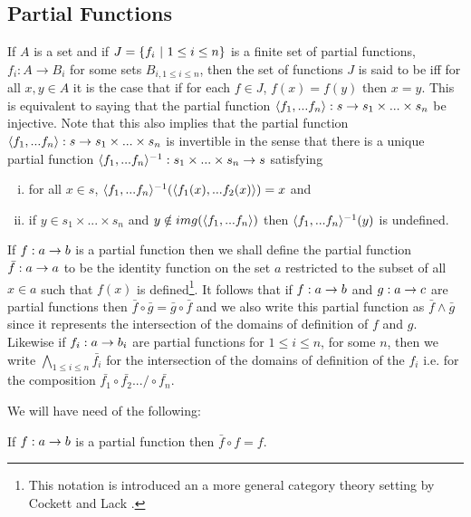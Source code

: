 \subsection{Partial Functions}
If $A$ is a set and if $J= \left\{f_i \ \middle|\  1\leq i \leq n\right\}$ is a finite set of partial functions, $f_i: A \rightarrow B_i$   for some sets $B_{i, 1 \leq i \leq n}$,  then the set of functions 
$J$ is said to be  iff for all $x,y \in A$ it is the case that  if  for each 
$f \in J$, $f(x)=f(y)$ then $x=y$. 
This  is equivalent to saying that  the partial function $\langle f_1,...f_n\rangle: s \rightarrow s_1 \times ... \times s_n $ be injective. Note that this also implies that the partial function $\langle f_1,...f_n\rangle: s \rightarrow s_1 \times ... \times s_n $ is invertible in the sense that there is a unique partial function $\langle f_1,...f_n\rangle^{-1} : s_1 \times ... \times s_n \rightarrow s$ satisfying
\begin{enumerate} [(i)]
\item for all $x \in s$, $\langle f_1,...f_n\rangle^{-1}(\langle f_1(x),...f_2(x) \rangle ) = x$ and 
\item  if $y \in s_1 \times ... \times s_n $ and
$y \notin img(\langle f_1,...f_n\rangle)$ then $\langle f_1,...f_n\rangle^{-1}(y)$ is undefined. 
\end{enumerate}

If $f: a \rightarrow b$ is a partial function then we shall define the partial function $\bar{f}: a \rightarrow a$ to be the identity function on the set $a$
restricted to the subset of all $x \in a$ such that $f(x)$ is defined\footnote{
This notation is introduced an a more general category theory setting by Cockett and Lack \cite{COCKETT2002}.}. It follows that if $f: a \rightarrow b$ and $g: a \rightarrow c$ are partial functions
then $\bar{f} \circ \bar{g} = \bar{g} \circ \bar{f}$ and we also write this partial function as $\bar{f} \wedge \bar{g}$ since it represents the intersection
of the domains of definition of $f$ and $g$. Likewise if $f_i:a \rightarrow b_i$ are partial functions for $1 \leq i \leq n$, for some $n$, then we write $\bigwedge\limits_{1 \leq i \leq n}{\bar{f_i}}$ for the intersection of the domains of definition of the $f_i$ i.e. for the composition
$\bar{f_1}\circ \bar{f_2} .../ \circ \bar{f_n}$.

We will have need of the following:
\begin{lemma}
If $f: a \rightarrow b$ is a partial function then $\bar{f} \circ f = f$.
\end{lemma}

